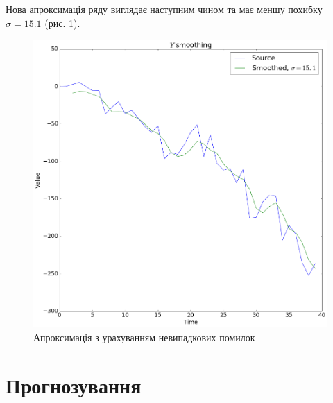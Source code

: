 Нова апроксимація ряду виглядає наступним чином та має меншу похибку
$\sigma = 15.1$ (рис. \ref{fig:error:estimate}).
\begin{figure}[h!]
  \centering
  \includegraphics[width=\textwidth]{Coursework_files/Coursework_35_0.png}
  \caption{Апроксимація з урахуванням невипадкових помилок}
  \label{fig:error:estimate}
\end{figure}

\section{Прогнозування}


